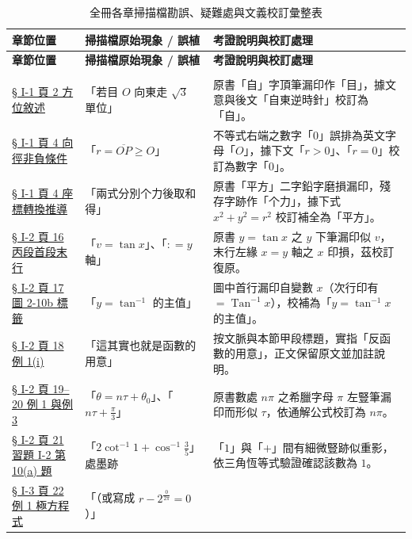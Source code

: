 \documentclass[a4paper,12pt,twoside]{article}
\begin{document}
\small
\renewcommand{\arraystretch}{1.35}
\begin{xltabular}{\textwidth}{|p{3.2cm}|p{3.8cm}|X|}
\caption{全冊各章掃描檔勘誤、疑難處與文義校訂彙整表}\label{tab:errata_b5_master} \\
\hline
\textbf{章節位置} & \textbf{掃描檔原始現象 / 誤植} & \textbf{考證說明與校訂處理} \\ \hline
\endfirsthead
\hline
\textbf{章節位置} & \textbf{掃描檔原始現象 / 誤植} & \textbf{考證說明與校訂處理} \\ \hline
\endhead
\hline
\endfoot
{} \\ \hline
\hyperref[note:b5-ch1-p2-zi]{§ I-1 頁 2 方位敘述} & 
「若目 $O$ 向東走 $\sqrt{3}$ 單位」 & 
原書「自」字頂筆漏印作「目」，據文意與後文「自東逆時針」校訂為「自」。 \\
\hline
\hyperref[note:b5-ch1-p4-ge0]{§ I-1 頁 4 向徑非負條件} & 
「$r = \overline{OP} \ge O$」 & 
不等式右端之數字「$0$」誤排為英文字母「$O$」，據下文「$r > 0$」、「$r = 0$」校訂為數字「$0$」。 \\
\hline
\hyperref[note:b5-ch1-p4-pingfang]{§ I-1 頁 4 座標轉換推導} & 
「兩式分別个力後取和得」 & 
原書「平方」二字鉛字磨損漏印，殘存字跡作「个力」，據下式 $x^2+y^2=r^2$ 校訂補全為「平方」。 \\
\hline
\hyperref[note:b5-ch1-p16bottom]{§ I-2 頁 16 丙段首段末行} & 
「$v = \tan x$」、「$: = y$ 軸」 & 
原書 $y = \tan x$ 之 $y$ 下筆漏印似 $v$，末行左緣 $x = y$ 軸之 $x$ 印損，茲校訂復原。 \\
\hline
\hyperref[note:b5-ch1-fig2-10b]{§ I-2 頁 17 圖 2-10b 標籤} & 
「$y = \tan^{-1}$ 的主值」 & 
圖中首行漏印自變數 $x$（次行印有 $= \operatorname{Tan}^{-1} x$），校補為「$y = \tan^{-1} x$ 的主值」。 \\
\hline
\hyperref[note:b5-ch1-p18ex1]{§ I-2 頁 18 例 1(i)} & 
「這其實也就是函數的用意」 & 
按文脈與本節甲段標題，實指「反函數的用意」，正文保留原文並加註說明。 \\
\hline
\hyperref[note:b5-ch1-p19pi]{§ I-2 頁 19--20 例 1 與例 3} & 
「$\theta = n\tau + \theta_0$」、「$n\tau + \frac{\pi}{3}$」 & 
原書數處 $n\pi$ 之希臘字母 $\pi$ 左豎筆漏印而形似 $\tau$，依通解公式校訂為 $n\pi$。 \\
\hline
\hyperref[note:b5-ch1-p21ex10a]{§ I-2 頁 21 習題 I-2 第 10(a) 題} & 
「$2\cot^{-1} 1 + \cos^{-1}\frac{3}{5}$」處墨跡 & 
「$1$」與「$+$」間有細微豎跡似重影，依三角恆等式驗證確認該數為 $1$。 \\
\hline
\hyperref[note:b5-ch1-p22-ex1]{§ I-3 頁 22 例 1 極方程式} & 
「（或寫成 $r - 2^{\frac{0}{2\pi}} = 0$）」 & 

\end{xltabular}
\end{document}
